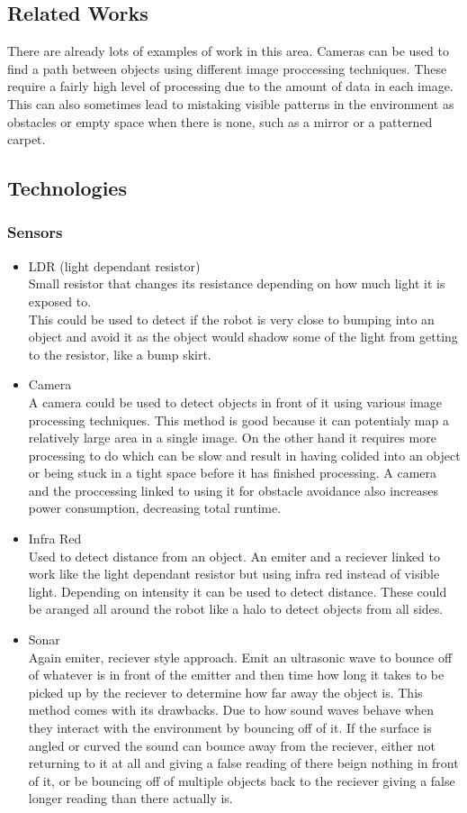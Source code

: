 \documentclass[11pt,fleqn,twoside]{article}
\begin{document}
\subsection{Related Works}
There are already lots of examples of work in this area.  Cameras can be used to find a path between objects using different image proccessing techniques.  These require a fairly high level of processing due to the amount of data in each image.  This can also sometimes lead to mistaking visible patterns in the environment as obstacles or empty space when there is none, such as a mirror or a patterned carpet. %
\subsection{Technologies}

\subsubsection{Sensors}
\begin{itemize}
\item LDR (light dependant resistor)
\\Small resistor that changes its resistance depending on how much light it is exposed to.
\\This could be used to detect if the robot is very close to bumping into an object and avoid it as the object would shadow some of the light from getting to the resistor, like a bump skirt.
\item Camera
\\A camera could be used to detect objects in front of it using various image processing techniques.  This method is good because it can potentialy map a relatively large area in a single image.  On the other hand it requires more processing to do which can be slow and result in having colided into an object or being stuck in a tight space before it has finished processing. A camera and the proccessing linked to using it for obstacle avoidance also increases power consumption, decreasing total runtime.
\item Infra Red
\\Used to detect distance from an object.  An emiter and a reciever linked to work like the light dependant resistor but using infra red instead of visible light.  Depending on intensity it can be used to detect distance.  These could be aranged all around the robot like a halo to detect objects from all sides.
\item Sonar
\\Again emiter, reciever style approach.  Emit an ultrasonic wave to bounce off of whatever is in  front of the emitter and then time how long it takes to be picked up by the reciever to determine how far away the object is.  This method comes with its drawbacks.  Due to how sound waves behave when they interact with the environment by bouncing off of it.  If the surface is angled or curved the sound can bounce away from the reciever, either not returning to it at all and giving a false reading of there beign nothing in front of it, or be bouncing off of multiple objects back to the reciever giving a false longer reading than there actually is.
\end{itemize}
\end{document}
